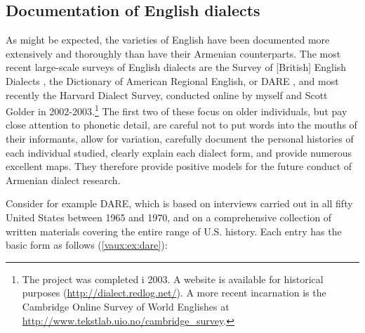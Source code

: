 \documentclass[output=paper]{langscibook}
\begin{document}
\subsection{Documentation of English dialects}\label{sec:vaux:documentation:eng}


As might be expected, the varieties of English have been documented more extensively and thoroughly than have their Armenian counterparts. The most recent large-scale surveys of English dialects are the Survey of [British] English Dialects \citep{OrtonDieth-1962-SurveyEnglishdialects,OrtonEtAl-1978-LinguisticAtlasEngland}, the Dictionary of American Regional English, or DARE \citep{CassidyHall-1985-DictionaryAmericanregionalEnglish}, and most recently the Harvard Dialect Survey, conducted online by myself and Scott Golder in 2002-2003.\footnote{The project was completed i 2003. A website is available for historical purposes (\url{http://dialect.redlog.net/}). A more recent incarnation is the    Cambridge Online Survey of World Englishes at \url{http://www.tekstlab.uio.no/cambridge_survey}.  } The first two of these focus on older individuals, but pay close attention to phonetic detail, are careful not to put words into the mouths of their informants, allow for variation, carefully document the personal histories of each individual studied, clearly explain each dialect form, and provide numerous excellent maps. They therefore provide positive models for the future conduct of Armenian dialect research.

Consider for example DARE, which is based on interviews carried out in all fifty United States between 1965 and 1970, and on a comprehensive collection of written materials covering the entire range of U.S. history. Each entry has the basic form as follows (\ref{vaux:ex:dare}):
\end{document}
